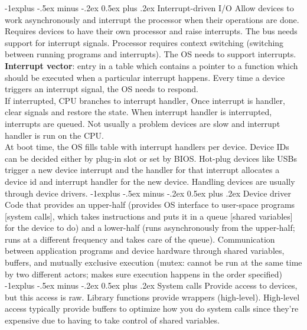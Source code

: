 \documentclass[10pt,landscape]{article}
\makeatletter
\renewcommand{\subsection}{\@startsection{subsection}{2}{0mm}%
                                {-1explus -.5ex minus -.2ex}%
                                {0.5ex plus .2ex}%
                                {\normalfont\scriptsize\bfseries}}
\makeatother
\begin{document}
\begin{multicols}{3}
\subsection{Interrupt-driven I/O}
Allow devices to work asynchronously and interrupt the processor when their operations are done. Requires devices to have their own processor and raise interrupts. The bus needs support for interrupt signals. Processor requires context switching (switching between running programs and interrupts). The OS needs to support interrupts.\\
\textbf{Interrupt vector}: entry in a table which contains a pointer to a function which should be executed when a particular interrupt happens. Every time a device triggers an interrupt signal, the OS needs to respond.\\
If interrupted, CPU branches to interrupt handler, Once interrupt is handler, clear signals and restore the state. When interrupt handler is interrupted, interrupts are queued. Not usually a problem devices are slow and interrupt handler is run on the CPU.\\
At boot time, the OS fills table with interrupt handlers per device. Device IDs can be decided either by plug-in slot or set by BIOS. Hot-plug devices like USBs trigger a new device interrupt and the handler for that interrupt allocates a device id and interrupt handler for the new device. Handling devices are usually through device drivers.
\subsection{Device driver}
Code that provides an upper-half (provides OS interface to user-space programs [system calls], which takes instructions and puts it in a queue [shared variables] for the device to do) and a lower-half (runs asynchronously from the upper-half; runs at a different frequency and takes care of the queue). Communication between application programs and device hardware through shared variables, buffers, and mutually exclusive execution (mutex: cannot be run at the same time by two different actors; makes sure execution happens in the order specified)
\subsection{System calls}
Provide access to devices, but this access is raw. Library functions provide wrappers (high-level). High-level access typically provide buffers to optimize how you do system calls since they're expensive due to having to take control of shared variables.

\end{multicols}
\end{document}
